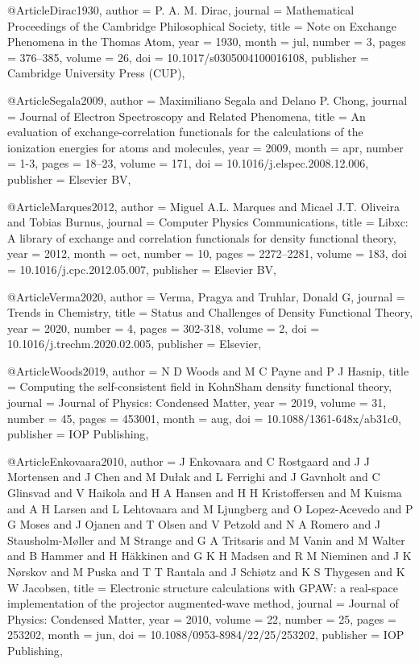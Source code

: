 @Article{Dirac1930,
  author    = {P. A. M. Dirac},
  journal   = {Mathematical Proceedings of the Cambridge Philosophical Society},
  title     = {Note on Exchange Phenomena in the Thomas Atom},
  year      = {1930},
  month     = {jul},
  number    = {3},
  pages     = {376--385},
  volume    = {26},
  doi       = {10.1017/s0305004100016108},
  publisher = {Cambridge University Press ({CUP})},
}

@Article{Segala2009,
  author    = {Maximiliano Segala and Delano P. Chong},
  journal   = {Journal of Electron Spectroscopy and Related Phenomena},
  title     = {An evaluation of exchange-correlation functionals for the calculations of the ionization energies for atoms and molecules},
  year      = {2009},
  month     = {apr},
  number    = {1-3},
  pages     = {18--23},
  volume    = {171},
  doi       = {10.1016/j.elspec.2008.12.006},
  publisher = {Elsevier {BV}},
}

@Article{Marques2012,
  author    = {Miguel A.L. Marques and Micael J.T. Oliveira and Tobias Burnus},
  journal   = {Computer Physics Communications},
  title     = {Libxc: A library of exchange and correlation functionals for density functional theory},
  year      = {2012},
  month     = {oct},
  number    = {10},
  pages     = {2272--2281},
  volume    = {183},
  doi       = {10.1016/j.cpc.2012.05.007},
  publisher = {Elsevier {BV}},
}

@Article{Verma2020,
  author    = {Verma, Pragya and Truhlar, Donald G},
  journal   = {Trends in Chemistry},
  title     = {Status and Challenges of Density Functional Theory},
  year      = {2020},
  number    = {4},
  pages     = {302-318},
  volume    = {2},
  doi       = {10.1016/j.trechm.2020.02.005},
  publisher = {Elsevier},
}

@Article{Woods2019,
  author    = {N D Woods and M C Payne and P J Hasnip},
  title     = {Computing the self-consistent field in Kohn{\textendash}Sham density functional theory},
  journal   = {Journal of Physics: Condensed Matter},
  year      = {2019},
  volume    = {31},
  number    = {45},
  pages     = {453001},
  month     = {aug},
  doi       = {10.1088/1361-648x/ab31c0},
  publisher = {{IOP} Publishing},
}

@Article{Enkovaara2010,
  author    = {J Enkovaara and C Rostgaard and J J Mortensen and J Chen and M Du{\l}ak and L Ferrighi and J Gavnholt and C Glinsvad and V Haikola and H A Hansen and H H Kristoffersen and M Kuisma and A H Larsen and L Lehtovaara and M Ljungberg and O Lopez-Acevedo and P G Moses and J Ojanen and T Olsen and V Petzold and N A Romero and J Stausholm-M{\o}ller and M Strange and G A Tritsaris and M Vanin and M Walter and B Hammer and H Häkkinen and G K H Madsen and R M Nieminen and J K N{\o}rskov and M Puska and T T Rantala and J Schi{\o}tz and K S Thygesen and K W Jacobsen},
  title     = {Electronic structure calculations with {GPAW}: a real-space implementation of the projector augmented-wave method},
  journal   = {Journal of Physics: Condensed Matter},
  year      = {2010},
  volume    = {22},
  number    = {25},
  pages     = {253202},
  month     = {jun},
  doi       = {10.1088/0953-8984/22/25/253202},
  publisher = {{IOP} Publishing},
}

